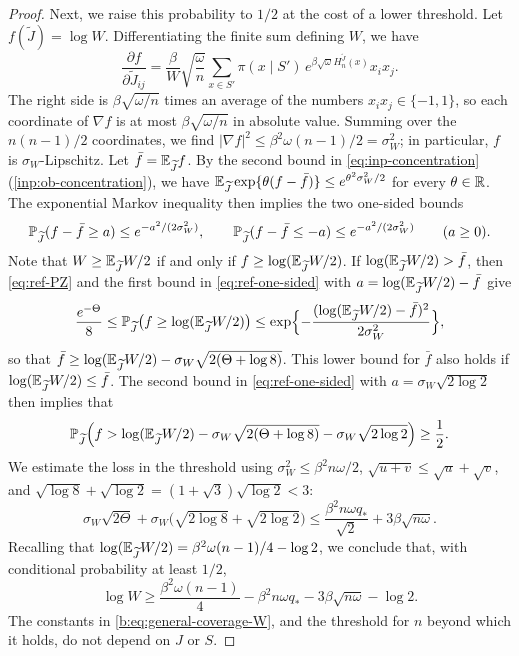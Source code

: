 \begin{proof}
Next, we raise this probability to $1/2$ at the cost of a lower threshold.
Let $f(\widetilde J)=\log W$. Differentiating the finite sum defining $W$, we have
\[
 \frac{\partial f}{\partial\widetilde J_{ij}}=\frac{\beta}{W}\sqrt{\frac\omega n}
   \sum_{x\in S'}\pi(x\mid S')\,e^{\beta\sqrt\omega H_n^{\widetilde J}(x)}x_ix_j .
\]
The right side is $\beta\sqrt{\omega/n}$ times an average of the numbers
$x_ix_j\in\{-1,1\}$, so each coordinate of $\nabla f$ is at most
$\beta\sqrt{\omega/n}$ in absolute value. Summing
over the $n(n-1)/2$ coordinates, we find
$|\nabla f|^2\le\beta^2\omega(n-1)/2=\sigma_W^2$; in particular, $f$ is
$\sigma_W$-Lipschitz. Let $\bar f=\mathbb E_{\widetilde J}f$. By the second bound in
\eqref{eq:inp-concentration} (\cref{inp:ob-concentration}), we have $\mathbb E_{\widetilde J}\exp\{\theta(f-\bar f)\}\le e^{\theta^2\sigma_W^2/2}$ for every
$\theta\in\mathbb R$. The exponential Markov inequality then implies the two
one-sided bounds
\begin{equation}\label{eq:ref-one-sided}
 \mathbb P_{\widetilde J}(f-\bar f\ge a)\le e^{-a^2/(2\sigma_W^2)},\qquad
 \mathbb P_{\widetilde J}(f-\bar f\le-a)\le e^{-a^2/(2\sigma_W^2)}\qquad(a\ge0).
\end{equation}
Note that $W\ge\mathbb E_{\widetilde J}W/2$ if and only if $f\ge\log(\mathbb E_{\widetilde J}W/2)$. If
$\log(\mathbb E_{\widetilde J}W/2)>\bar f$, then \eqref{eq:ref-PZ} and the first bound in
\eqref{eq:ref-one-sided} with $a=\log(\mathbb E_{\widetilde J}W/2)-\bar f$ give
\[
 \frac{e^{-\Theta}}8\le\mathbb P_{\widetilde J}\bigl(f\ge\log(\mathbb E_{\widetilde J}W/2)\bigr)
 \le\exp\Bigl\{-\frac{(\log(\mathbb E_{\widetilde J}W/2)-\bar f)^2}{2\sigma_W^2}\Bigr\},
\]
so that $\bar f\ge\log(\mathbb E_{\widetilde J}W/2)-\sigma_W\sqrt{2(\Theta+\log8)}$. This lower
bound for $\bar f$ also holds if $\log(\mathbb E_{\widetilde J}W/2)\le\bar f$. The second
bound in \eqref{eq:ref-one-sided} with $a=\sigma_W\sqrt{2\log2}$ then implies
that
\[
 \mathbb P_{\widetilde J}\Bigl(f>\log(\mathbb E_{\widetilde J}W/2)-\sigma_W\sqrt{2(\Theta+\log8)}
     -\sigma_W\sqrt{2\log2}\Bigr)\ge\frac12 .
\]
We estimate the loss in the threshold using $\sigma_W^2\le\beta^2n\omega/2$,
$\sqrt{u+v}\le\sqrt u+\sqrt v$, and
$\sqrt{\log8}+\sqrt{\log2}=(1+\sqrt3)\sqrt{\log2}<3$:
\[
 \sigma_W\sqrt{2\Theta}
   +\sigma_W\bigl(\sqrt{2\log8}+\sqrt{2\log2}\bigr)
 \le\frac{\beta^2n\omega q_*}{\sqrt2}+3\beta\sqrt{n\omega} .
\]
Recalling that $\log(\mathbb E_{\widetilde J}W/2)=\beta^2\omega(n-1)/4-\log2$, we conclude
that, with conditional probability at least $1/2$,
\begin{equation}\label{b:eq:general-coverage-W}
 \log W\ge\frac{\beta^2\omega(n-1)}4-\beta^2n\omega q_*
   -3\beta\sqrt{n\omega}-\log2 .
\end{equation}
The constants in \eqref{b:eq:general-coverage-W}, and the threshold for $n$
beyond which it holds, do not depend on $J$ or $S$.


\end{proof}
